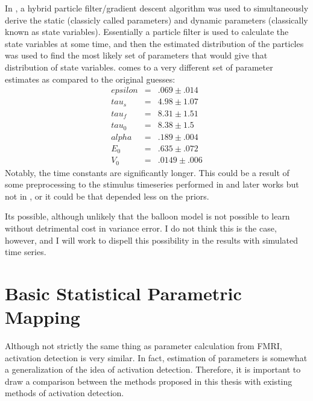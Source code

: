 In \cite{Johnston2008}, a hybrid particle filter/gradient
descent algorithm was used to simultaneously derive the static (classicly called
parameters) and dynamic parameters (classically known as state variables).
Essentially a particle filter is used to calculate the state variables at some
time, and then the estimated distribution of the particles was used to find
the most likely set of parameters that would give that distribution of state variables.
\cite{Johnston2008} comes to a very different set of parameter estimates as compared
to the original \cite{Friston2000} guesses:
\begin{eqnarray}
epsilon &=& .069 \pm .014    \nonumber \\
tau_s & =& 4.98 \pm 1.07  \nonumber \\
tau_f & =& 8.31 \pm 1.51   \nonumber \\
tau_0 & =& 8.38 \pm 1.5    \nonumber \\
alpha & =& .189 \pm .004   \nonumber \\
E_0   & =& .635 \pm .072     \nonumber \\
V_0   & =& .0149 \pm .006     \nonumber 
\end{eqnarray}
Notably, the time constants are significantly longer. This could be a result of
some preprocessing to the stimulus timeseries performed in \cite{Friston2002} and
later works but not in \cite{Johnston2008}, or it could be that \cite{Johnston2008}
depended less on the priors. 

Its possible, although unlikely that the balloon model is not possible to learn
without detrimental cost in variance error. I do not think this is the case, however,
and I will work to dispell this possibility in the results with simulated time
series.

\section{Basic Statistical Parametric Mapping}
Although not strictly the same thing as parameter calculation from 
FMRI, activation detection is very similar. In fact, estimation of 
parameters is somewhat a generalization of the idea of activation detection.
Therefore, it is important to draw a comparison between the methods proposed
in this thesis with existing methods of activation detection.

